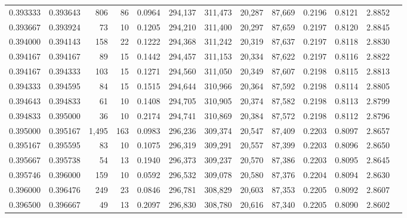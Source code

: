 \begin{tabular}{rrrrrrrrrrrrr}
0.393333 & 0.393643 &   806 &  86 &                                     0.0964 & 294,137 & 311,473 &  20,287 &  87,669 & 0.2196 & 0.8121 & 2.8852 \\
0.393667 & 0.393924 &    73 &  10 &                                     0.1205 & 294,210 & 311,400 &  20,297 &  87,659 & 0.2197 & 0.8120 & 2.8845 \\
0.394000 & 0.394143 &   158 &  22 &                                     0.1222 & 294,368 & 311,242 &  20,319 &  87,637 & 0.2197 & 0.8118 & 2.8830 \\
0.394167 & 0.394167 &    89 &  15 &                                     0.1442 & 294,457 & 311,153 &  20,334 &  87,622 & 0.2197 & 0.8116 & 2.8822 \\
0.394167 & 0.394333 &   103 &  15 &                                     0.1271 & 294,560 & 311,050 &  20,349 &  87,607 & 0.2198 & 0.8115 & 2.8813 \\
0.394333 & 0.394595 &    84 &  15 &                                     0.1515 & 294,644 & 310,966 &  20,364 &  87,592 & 0.2198 & 0.8114 & 2.8805 \\
0.394643 & 0.394833 &    61 &  10 &                                     0.1408 & 294,705 & 310,905 &  20,374 &  87,582 & 0.2198 & 0.8113 & 2.8799 \\
0.394833 & 0.395000 &    36 &  10 &                                     0.2174 & 294,741 & 310,869 &  20,384 &  87,572 & 0.2198 & 0.8112 & 2.8796 \\
0.395000 & 0.395167 & 1,495 & 163 &                                     0.0983 & 296,236 & 309,374 &  20,547 &  87,409 & 0.2203 & 0.8097 & 2.8657 \\
0.395167 & 0.395595 &    83 &  10 &                                     0.1075 & 296,319 & 309,291 &  20,557 &  87,399 & 0.2203 & 0.8096 & 2.8650 \\
0.395667 & 0.395738 &    54 &  13 &                                     0.1940 & 296,373 & 309,237 &  20,570 &  87,386 & 0.2203 & 0.8095 & 2.8645 \\
0.395746 & 0.396000 &   159 &  10 &                                     0.0592 & 296,532 & 309,078 &  20,580 &  87,376 & 0.2204 & 0.8094 & 2.8630 \\
0.396000 & 0.396476 &   249 &  23 &                                     0.0846 & 296,781 & 308,829 &  20,603 &  87,353 & 0.2205 & 0.8092 & 2.8607 \\
0.396500 & 0.396667 &    49 &  13 &                                     0.2097 & 296,830 & 308,780 &  20,616 &  87,340 & 0.2205 & 0.8090 & 2.8602 \\

\end{tabular}
